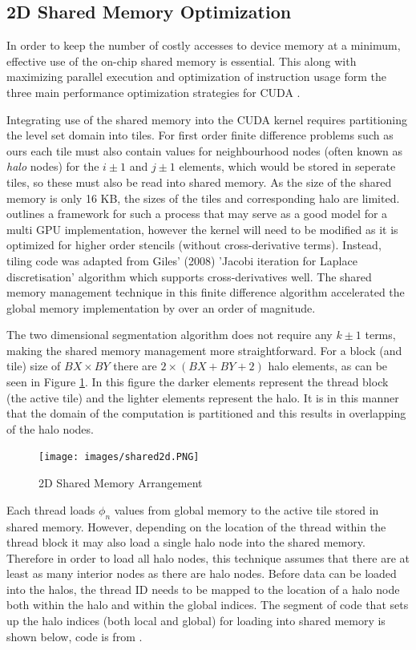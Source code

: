 	\subsection{2D Shared Memory Optimization}
In order to keep the number of costly accesses to device memory at a minimum, effective use of the on-chip shared memory is essential. This along with maximizing parallel execution and optimization of instruction usage form the three main performance optimization strategies for CUDA \cite{cuda}.

Integrating use of the shared memory into the CUDA kernel requires partitioning the level set domain into tiles. For first order finite difference problems such as ours each tile must also contain values for neighbourhood nodes (often known as \textit{halo} nodes) for the $i\pm1$ and $j\pm1$ elements, which would be stored in seperate tiles, so these must also be read into shared memory. As the size of the shared memory is only 16 KB, the sizes of the tiles and corresponding halo are limited. \cite{3dfinitedifference} outlines a framework for such a process that may serve as a good model for a multi GPU implementation, however the kernel will need to be modified as it is optimized for higher order stencils (without cross-derivative terms). Instead, tiling code was adapted from Giles' (2008) 'Jacobi iteration for Laplace discretisation' algorithm \cite{mgiles} which supports cross-derivatives well. The shared memory management technique in this finite difference algorithm accelerated the global memory implementation by over an order of magnitude.

The two dimensional segmentation algorithm does not require any $k\pm1$ terms, making the shared memory management more straightforward. For a block (and tile) size of $BX\times BY$ there are $2 \times (BX + BY +2)$ halo elements, as can be seen in Figure \ref{fig:shared2d}. In this figure the darker elements represent the thread block (the active tile) and the lighter elements represent the halo. It is in this manner that the domain of the computation is partitioned and this results in overlapping of the halo nodes.\\

\begin{figure}[h]
	\centering
		\texttt{[image: images/shared2d.PNG]}
	\caption{2D Shared Memory Arrangement}
	\label{fig:shared2d}
\end{figure}


Each thread loads  $\phi_n$ values from global memory to the active tile stored in shared memory. However, depending on the location of the thread within the thread block it may also load a single halo node into the shared memory. Therefore in order to load all halo nodes, this technique assumes that there are at least as many interior nodes as there are halo nodes. Before data can be loaded into the halos, the thread ID needs to be mapped to the location of a halo node both within the halo and within the global indices. The segment of code that sets up the halo indices (both local and global) for loading into shared memory is shown below, code is from \cite{mgiles}.

